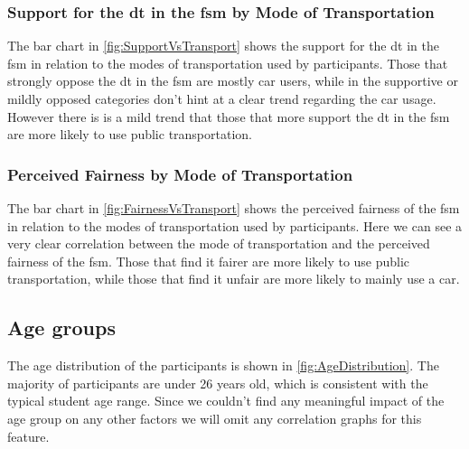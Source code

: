 \subsubsection{Support for the \gls{dt} in the \gls{fsm} by Mode of Transportation}
\begin{multicols}{2}
    
    \columnbreak
    The bar chart in \ref{fig:SupportVsTransport} shows the support for the \gls{dt} in the \gls{fsm} in relation to the modes of transportation used by participants.
    Those that strongly oppose the \gls{dt} in the \gls{fsm} are mostly car users, while in the supportive or mildly opposed categories don't hint at a clear trend regarding the car usage.
    However there is is a mild trend that those that more support the \gls{dt} in the \gls{fsm} are more likely to use public transportation.
\end{multicols}

\subsubsection{Perceived Fairness by Mode of Transportation}
\begin{multicols}{2}
    
    \columnbreak
    The bar chart in \ref{fig:FairnessVsTransport} shows the perceived fairness of the \gls{fsm} in relation to the modes of transportation used by participants.
    Here we can see a very clear correlation between the mode of transportation and the perceived fairness of the \gls{fsm}.
    Those that find it fairer are more likely to use public transportation, while those that find it unfair are more likely to mainly use a car.
\end{multicols}

\pagebreak

\subsection{Age groups}
\begin{multicols}{2}
    
    \columnbreak
    The age distribution of the participants is shown in \ref{fig:AgeDistribution}. The majority of participants are under 26 years old, which is consistent with the typical student age range.
    Since we couldn't find any meaningful impact of the age group on any other factors we will omit any correlation graphs for this feature.
\end{multicols}

